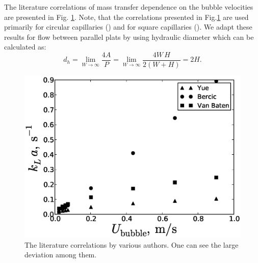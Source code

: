 \documentclass{article}
\begin{document}
The literature correlations of mass transfer dependence on the bubble velocities are presented in
Fig. \ref{fig:mass:transfer:theoretical}. Note, that the correlations presented in
Fig.\ref{fig:mass:transfer:theoretical} are used primarily for circular capillaries
(\citeauthor{vanbaten-circular,bercic-mass}) and for square capillaries (\citeauthor{yue-mass}). We
adapt these results for flow between parallel plats by using hydraulic
diameter \cite{bercic-mass} which can be calculated as:
\begin{equation}
d_h = \lim_{W\to\infty}\frac{4A}{P}=\lim_{W\to\infty}\frac{4 W\,H}{2(W+H)}=2 H.
\end{equation}
\begin{figure}[htb!]
\includegraphics[width=\textwidth]{Figures/theoretical_correlations.eps}
\caption{The literature correlations by various authors. One
can see the large deviation among them.\label{fig:mass:transfer:theoretical}}
\end{figure}
\end{document}
